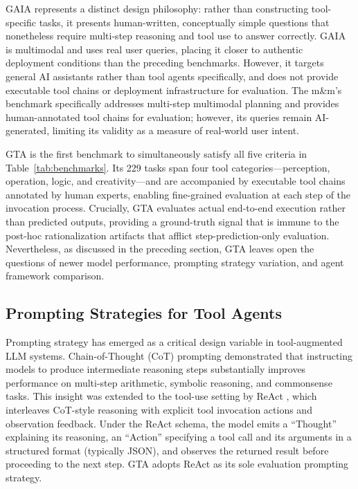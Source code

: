 \documentclass[conference]{IEEEtran}
\begin{document}
GAIA \cite{mialon2023gaia} represents a distinct design philosophy: rather than constructing tool-specific tasks, it presents human-written, conceptually simple questions that nonetheless require multi-step reasoning and tool use to answer correctly. GAIA is multimodal and uses real user queries, placing it closer to authentic deployment conditions than the preceding benchmarks. However, it targets general AI assistants rather than tool agents specifically, and does not provide executable tool chains or deployment infrastructure for evaluation. The m\&m's benchmark \cite{ma2024mms} specifically addresses multi-step multimodal planning and provides human-annotated tool chains for evaluation; however, its queries remain AI-generated, limiting its validity as a measure of real-world user intent.

GTA \cite{wang2024gta} is the first benchmark to simultaneously satisfy all five criteria in Table~\ref{tab:benchmarks}. Its 229 tasks span four tool categories---perception, operation, logic, and creativity---and are accompanied by executable tool chains annotated by human experts, enabling fine-grained evaluation at each step of the invocation process. Crucially, GTA evaluates actual end-to-end execution rather than predicted outputs, providing a ground-truth signal that is immune to the post-hoc rationalization artifacts that afflict step-prediction-only evaluation. Nevertheless, as discussed in the preceding section, GTA leaves open the questions of newer model performance, prompting strategy variation, and agent framework comparison.

\subsection{Prompting Strategies for Tool Agents}

Prompting strategy has emerged as a critical design variable in tool-augmented LLM systems. Chain-of-Thought (CoT) prompting \cite{wei2022cot} demonstrated that instructing models to produce intermediate reasoning steps substantially improves performance on multi-step arithmetic, symbolic reasoning, and commonsense tasks. This insight was extended to the tool-use setting by ReAct \cite{yao2023react}, which interleaves CoT-style reasoning with explicit tool invocation actions and observation feedback. Under the ReAct schema, the model emits a ``Thought'' explaining its reasoning, an ``Action'' specifying a tool call and its arguments in a structured format (typically JSON), and observes the returned result before proceeding to the next step. GTA adopts ReAct as its sole evaluation prompting strategy.
\end{document}
